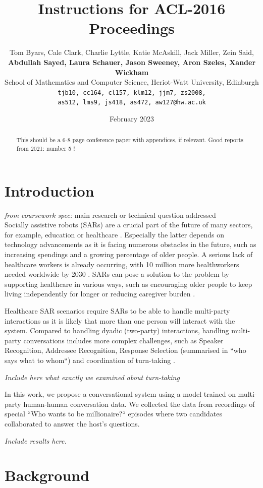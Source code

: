\documentclass[hidelinks, 11pt]{article}
\title{Instructions for ACL-2016 Proceedings}
\author{Tom Byars, Cale Clark, Charlie Lyttle, Katie McAskill, Jack Miller, Zein Said, \\
{\bf Abdullah Sayed, Laura Schauer, Jason Sweeney, Aron Szeles, Xander Wickham} \\
School of Mathematics and Computer Science, Heriot-Watt University, Edinburgh \\ {\tt {tjb10, cc164, cl157, klm12, jjm7, zs2008,}} \\ {\tt {as512, lms9, js418, as472, aw127}@hw.ac.uk}}
\date{February 2023}
\begin{document}
\maketitle
\begin{abstract}
  This should be a 6-8 page conference paper with appendices, if relevant.
  Good reports from 2021: number 5 !
\end{abstract}


\section{Introduction}
\label{sec:introduction}

\textit{from coursework spec:} main research or technical question addressed \\
Socially assistive robots (SARs) are a crucial part of the future of many sectors, for example, education or healthcare \cite{gunson_visually_aware_2022}. Especially the latter depends on technology advancements as it is facing numerous obstacles in the future, such as increasing spendings and a growing percentage of older people. A serious lack of healthcare workers is already occurring, with 10 million more healthworkers needed worldwide by 2030 \cite{cooper_ari_2020,Health_workforce_2023}. SARs can pose a solution to the problem by supporting healthcare in various ways, such as encouraging older people to keep living independently for longer or reducing caregiver burden \cite{cooper_ari_2020}.

Healthcare SAR scenarios require SARs to be able to handle multi-party interactions as it is likely that more than one person will interact with the system. Compared to handling dyadic (two-party) interactions, handling multi-party conversations includes more complex challenges, such as Speaker Recognition, Addressee Recognition, Response Selection (summarised in “who says what to whom“) and coordination of turn-taking \cite{Group_1_unpublished_paper,Johansson_Skantze_2015}.

\textit{Include here what exactly we examined about turn-taking}

In this work, we propose a conversational system using a model trained on multi-party human-human conversation data. We collected the data from recordings of special “Who wants to be millionaire?“ episodes where two candidates collaborated to answer the host's questions.

\textit{Include results here.}


\section{Background}
\label{sec:background}
\end{document}
